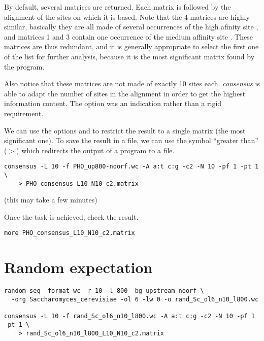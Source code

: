 By default, several matrices are returned. Each matrix is followed by
the alignment of the sites on which it is based. Note that the 4
matrices are highly similar, basically they are all made of several
occurrences of the high afinity site , and matrices 1 and
3 contain one occurrence of the medium affinity site
. These matrices are thus redundant, and it is generally
appropriate to select the first one of the list for further analysis,
because it is the most significant matrix found by the program.

Also notice that these matrices are not made of exactly 10 sites
each. \textit{consensus} is able to adapt the number of sites in the
alignment in order to get the highest information content. The option
 was an indication rather than a rigid requirement.

We can use the options  and  to restrict the
result to a single matrix (the most significant one). To save the
result in a file, we can use the symbol ``greater than'' ($>$) which
redirects the output of a program to a file.

{\color{Blue} \begin{footnotesize} 
\begin{verbatim}
consensus -L 10 -f PHO_up800-noorf.wc -A a:t c:g -c2 -N 10 -pf 1 -pt 1 \
    > PHO_consensus_L10_N10_c2.matrix
\end{verbatim} \end{footnotesize}
}

(this may take a few minutes)

Once the task is achieved, check the result.

{\color{Blue} \begin{footnotesize} 
\begin{verbatim}
more PHO_consensus_L10_N10_c2.matrix
\end{verbatim} \end{footnotesize}
}

\section{Random expectation}


{\color{Blue} \begin{footnotesize} 
\begin{verbatim}
random-seq -format wc -r 10 -l 800 -bg upstream-noorf \
  -org Saccharomyces_cerevisiae -ol 6 -lw 0 -o rand_Sc_ol6_n10_l800.wc 

consensus -L 10 -f rand_Sc_ol6_n10_l800.wc -A a:t c:g -c2 -N 10 -pf 1 -pt 1 \
    > rand_Sc_ol6_n10_l800_L10_N10_c2.matrix
\end{verbatim} \end{footnotesize}
}
